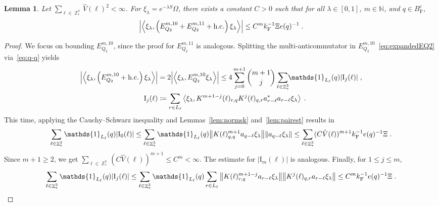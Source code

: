 \documentclass[12pt,a4paper]{article}
\numberwithin{equation}{section}
\newcommand{\NNN}{\mathbb{N}}
\newcommand{\1}{\mathbb{I}}
\newcommand{\F}{\mathrm{F}}
\newcommand{\I}{\mathrm{I}}
\DeclareMathOperator{\Z}{\mathbb{Z}}
\newcommand{\eva}[1]{\left\langle #1 \right\rangle}
\theoremstyle{plain}
\newtheorem{lemma}[theorem]{Lemma}
\theoremstyle{definition}
\theoremstyle{remark}
\theoremstyle{plain}
\theoremstyle{definition}
\theoremstyle{remark}
\begin{document}
\begin{lemma} \label{lem:EQ212}
Let $ \sum_{\ell \in \Z^3_*} \hat{V}(\ell)^2 < \infty $. For $\xi_\lambda = e^{-\lambda S} \Omega$, there exists a constant $ C > 0 $ such that for all $ \lambda \in [0,1] $, $ m \in \NNN $, and $ q \in B_{\F}^c $,
\begin{equation}
	\abs{\eva{\xi_\lambda,\left(E^{m,10}_{Q_2}+E^{m,11}_{Q_2}+\mathrm{h.c.}\right) \xi_\lambda }}
	\leq C^m k_{\F}^{-1} \Xi e(q)^{-1} \;. \label{eq:estEQ212}
\end{equation}
\end{lemma}

\begin{proof}
We focus on bounding $ E^{m,10}_{Q_2} $, since the proof for $ E^{m,11}_{Q_2} $ is analogous.
Splitting the multi-anticommutator in $ E^{m,10}_{Q_2} $~\eqref{eq:expandedEQ2} via~\eqref{eq:q-q} yields
\begin{equation} \label{eq:EQ2121}
\begin{aligned}
	\abs{\eva{\xi_\lambda,\left(E^{m,10}_{Q_2}+\mathrm{h.c.}\right) \xi_\lambda }} 
	&= 2\abs{\eva{\xi_\lambda, E^{m,10}_{Q_2} \xi_\lambda }}
	\le 4 \sum_{j=0}^{m+1} {{m+1}\choose j} \sum\limits_{\ell  \in \Z^3_*}\!\! \mathds{1}_{L_\ell}(q) |\I_j(\ell)| \;,\\
	\I_j(\ell)
	&\coloneq \sum\limits_{r\in L_{\ell}}
		\eva{\xi_\lambda, K^{m+1-j}(\ell)_{r,q} K^{j}(\ell)_{q,r} a^*_{r-\ell} a_{r-\ell} \xi_\lambda} \;. \\
\end{aligned}
\end{equation}
This time, applying the Cauchy--Schwarz inequality and Lemmas~\ref{lem:normsk} and~\ref{lem:pairest} results in
\textcolor{green!30!black}{
\begin{equation}
	\sum_{\ell \in \Z^3_*} \mathds{1}_{L_\ell}(q) |\I_0(\ell)|
	\leq \sum_{\ell \in \Z^3_*} \mathds{1}_{L_\ell}(q) \norm{ K(\ell)^{m+1}_{q,q} a_{q-\ell} \xi_\lambda}\norm{ a_{q-\ell} \xi_\lambda }
	\leq \sum_{\ell \in \Z^3_*} (C \hat{V}(\ell))^{m+1}
		k_{\F}^{-1} e(q)^{-1} \Xi \;.\label{eq:estEQ2121}
\end{equation}
Since $ m+1 \ge 2 $, we get $ \sum_{\ell \in \Z^3_*} (C \hat{V}(\ell))^{m+1} \le C^m < \infty $. The estimate for $ |\I_m(\ell)| $ is analogous. Finally, for $ 1 \le j \le m $,
\begin{equation}
	\sum_{\ell \in \Z^3_*} \mathds{1}_{L_\ell}(q) |\I_j(\ell)|
	\leq \sum_{\ell \in \Z^3_*} \mathds{1}_{L_\ell}(q)
		\sum\limits_{r \in L_{\ell}}
		\norm{ K(\ell)^{m+1-j}_{r,q} a_{r-\ell}\xi_\lambda}
		\norm{ K^j(\ell)_{q,r} a_{r-\ell} \xi_\lambda }
	\leq C^m k_{\F}^{-1} e(q)^{-1} \Xi \;. \label{eq:estEQ2122}
\end{equation}
}
\end{proof}
\end{document}
